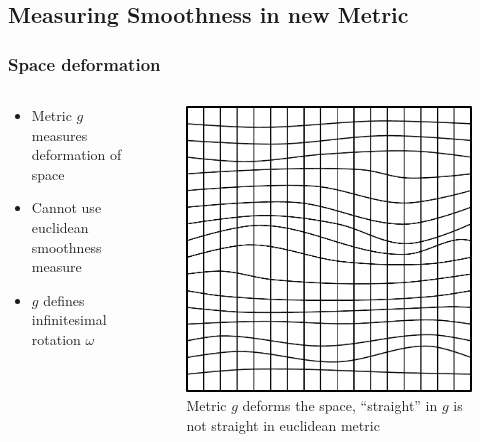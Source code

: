 \documentclass[
	11pt, %
	aspectratio=169, %
]{beamer}
\begin{document}

\subsection{Measuring Smoothness in new Metric}

\begin{frame}
	\frametitle{Space deformation}
	\begin{columns}[c] %
	
		\begin{column}{0.5\textwidth} %
			\begin{itemize}
				\item Metric $g$ measures deformation of space
				\item Cannot use euclidean smoothness measure
				\item $g$ defines infinitesimal rotation $\omega$
			\end{itemize}
		\end{column}
		\begin{column}{0.45\textwidth} %
			\begin{figure}
				\includegraphics[width=0.8\linewidth]{lattice-grid.pdf}
				\caption{Metric $g$ deforms the space, ``straight'' in $g$ is not straight in euclidean metric}
			\end{figure}
		\end{column}
	\end{columns}
\end{frame}
\end{document}
